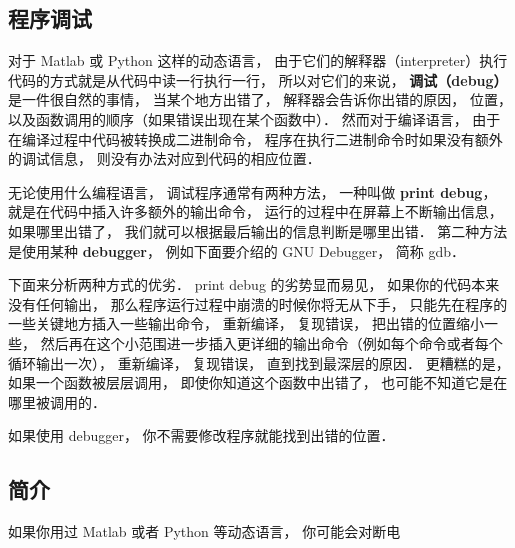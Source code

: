 
\subsection{程序调试}

对于 Matlab 或 Python 这样的动态语言， 由于它们的解释器（interpreter）执行代码的方式就是从代码中读一行执行一行， 所以对它们的来说， \textbf{调试（debug）}是一件很自然的事情， 当某个地方出错了， 解释器会告诉你出错的原因， 位置， 以及函数调用的顺序（如果错误出现在某个函数中）． 然而对于编译语言， 由于在编译过程中代码被转换成二进制命令， 程序在执行二进制命令时如果没有额外的调试信息， 则没有办法对应到代码的相应位置．

无论使用什么编程语言， 调试程序通常有两种方法， 一种叫做 \textbf{print debug}， 就是在代码中插入许多额外的输出命令， 运行的过程中在屏幕上不断输出信息， 如果哪里出错了， 我们就可以根据最后输出的信息判断是哪里出错． 第二种方法是使用某种 \textbf{debugger}， 例如下面要介绍的 GNU Debugger， 简称 gdb．

下面来分析两种方式的优劣． print debug 的劣势显而易见， 如果你的代码本来没有任何输出， 那么程序运行过程中崩溃的时候你将无从下手， 只能先在程序的一些关键地方插入一些输出命令， 重新编译， 复现错误， 把出错的位置缩小一些， 然后再在这个小范围进一步插入更详细的输出命令（例如每个命令或者每个循环输出一次）， 重新编译， 复现错误， 直到找到最深层的原因． 更糟糕的是， 如果一个函数被层层调用， 即使你知道这个函数中出错了， 也可能不知道它是在哪里被调用的．

如果使用 debugger， 你不需要修改程序就能找到出错的位置． 

\subsection{简介}
如果你用过 Matlab 或者 Python 等动态语言， 你可能会对断电
